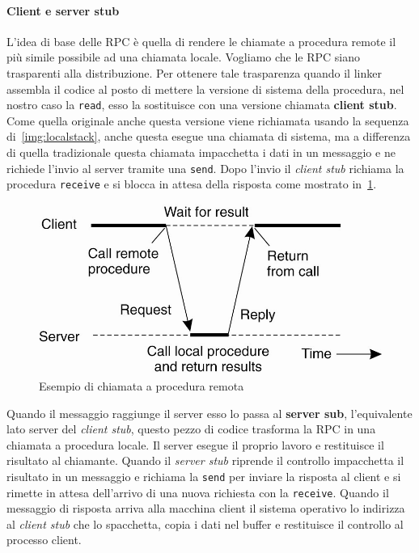 \paragraph{Client e server stub}
L'idea di base delle RPC è quella di rendere le chiamate a procedura remote il più simile possibile ad una chiamata locale. Vogliamo che le RPC siano trasparenti alla distribuzione. Per ottenere tale trasparenza quando il linker assembla il codice al posto di mettere la versione di sistema della procedura, nel nostro caso la \texttt{read}, esso la sostituisce con una versione chiamata \textbf{client stub}. Come quella originale anche questa versione viene richiamata usando la sequenza di \figurename\,\ref{img:localstack}, anche questa esegue una chiamata di sistema, ma a differenza di quella tradizionale questa chiamata impacchetta i dati in un messaggio e ne richiede l'invio al server tramite una \texttt{send}. Dopo l'invio il \emph{client stub} richiama la procedura \texttt{receive} e si blocca in attesa della risposta come mostrato in \figurename\,\ref{img:stub}.
\begin{figure}
\centering
\includegraphics[scale=0.55]{img/stub.png}
\caption{Esempio di chiamata a procedura remota}\label{img:stub}
\end{figure}
Quando il messaggio raggiunge il server esso lo passa al \textbf{server sub}, l'equivalente lato server del \emph{client stub}, questo pezzo di codice trasforma la RPC in una chiamata a procedura locale. Il server esegue il proprio lavoro e restituisce il risultato al chiamante. Quando il \emph{server stub} riprende il controllo impacchetta il risultato in un messaggio e richiama la \texttt{send} per inviare la risposta al client e si rimette in attesa dell'arrivo di una nuova richiesta con la \texttt{receive}. Quando il messaggio di risposta arriva alla macchina client il sistema operativo lo indirizza al \emph{client stub} che lo spacchetta, copia i dati nel buffer e restituisce il controllo al processo client.\\
